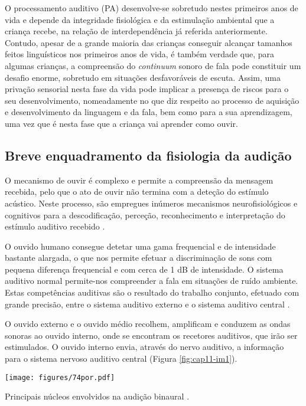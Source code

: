 \documentclass[output=paper,colorlinks,citecolor=brown,booklanguage=portuguese]{langscibook}
\begin{document}
O processamento auditivo (PA) desenvolve-se sobretudo nestes primeiros anos de vida e depende da integridade fisiológica e da estimulação ambiental que a criança recebe, na relação de interdependência já referida anteriormente. Contudo, apesar de a grande maioria das crianças conseguir alcançar tamanhos feitos linguísticos nos primeiros anos de vida, é também verdade que, para algumas crianças, a compreensão do \emph{continuum} sonoro de fala pode constituir um desafio enorme, sobretudo em situações desfavoráveis de escuta.  Assim, uma privação sensorial nesta fase da vida pode implicar a presença de riscos para o seu desenvolvimento, nomeadamente no que diz respeito ao processo de aquisição e desenvolvimento da linguagem e da fala, bem como para a sua aprendizagem, uma vez que é nesta fase que a criança vai aprender como ouvir.

\subsection{Breve enquadramento da fisiologia da audição}
O mecanismo de ouvir é complexo e permite a compreensão da mensagem recebida, pelo que o ato de ouvir não termina com a deteção do estímulo acústico. Neste processo, são empregues inúmeros mecanismos neurofisiológicos e cognitivos para a descodificação, perceção, reconhecimento e interpretação do estímulo auditivo recebido \citep{Bellis2003}.

O ouvido humano consegue detetar uma gama frequencial e de intensidade bastante alargada, o que nos permite efetuar a discriminação de sons com pequena diferença frequencial e com cerca de 1 dB de intensidade. O sistema auditivo normal permite-nos compreender a fala em situações de ruído ambiente. Estas competências auditivas são o resultado do trabalho conjunto, efetuado com grande precisão, entre o sistema auditivo externo e o sistema auditivo central \citep{Musiek2012}.

O ouvido externo e o ouvido médio recolhem, amplificam e conduzem as ondas sonoras ao ouvido interno, onde se encontram os recetores auditivos, que irão ser estimulados. O ouvido interno envia, através do nervo auditivo, a informação para o sistema nervoso auditivo central (Figura \ref{fig:cap11-im1}).



\begin{Figura}
    \texttt{[image: figures/74por.pdf]}
\caption{Principais núcleos envolvidos na audição binaural \citep{Porter2012}.}
\label{fig:cap11-im1}
\end{Figura}
\end{document}
